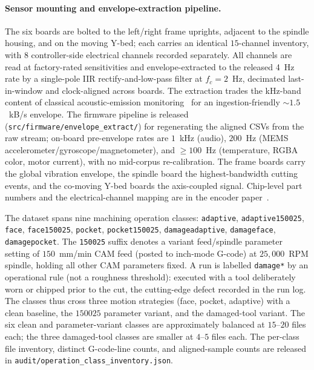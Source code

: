 \documentclass[sensors,article,submit,moreauthors,pdftex]{Definitions/mdpi}
\begin{document}
\paragraph{Sensor mounting and envelope-extraction pipeline.} The six boards are bolted to the left/right frame uprights, adjacent to the spindle housing, and on the moving Y-bed; each carries an identical $15$-channel inventory, with 8 controller-side electrical channels recorded separately. All channels are read at factory-rated sensitivities and envelope-extracted to the released 4~Hz rate by a single-pole IIR rectify-and-low-pass filter at $f_c\!=\!2$~Hz, decimated last-in-window and clock-aligned across boards. The extraction trades the kHz-band content of classical acoustic-emission monitoring~\cite{teti2010advanced} for an ingestion-friendly $\sim 1.5$~kB/s envelope. The firmware pipeline is released (\texttt{src/firmware/envelope\_extract/}) for regenerating the aligned CSVs from the raw stream; on-board pre-envelope rates are $1$~kHz (audio), $200$~Hz (MEMS accelerometer/gyroscope/magnetometer), and $\geq\!100$~Hz (temperature, RGBA color, motor current), with no mid-corpus re-calibration. The frame boards carry the global vibration envelope, the spindle board the highest-bandwidth cutting events, and the co-moving Y-bed boards the axis-coupled signal. Chip-level part numbers and the electrical-channel mapping are in the encoder paper~\cite{encoder_paper}.

The dataset spans nine machining operation classes: \texttt{adaptive}, \texttt{adaptive150025}, \texttt{face}, \texttt{face150025}, \texttt{pocket}, \texttt{pocket150025}, \texttt{damageadaptive}, \texttt{damageface}, \texttt{damagepocket}. The \texttt{150025} suffix denotes a variant feed/spindle parameter setting of $150$~mm/min CAM feed (posted to inch-mode G-code) at $25{,}000$~RPM spindle, holding all other CAM parameters fixed. A run is labelled \texttt{damage*} by an operational rule (not a roughness threshold): executed with a tool deliberately worn or chipped prior to the cut, the cutting-edge defect recorded in the run log. The classes thus cross three motion strategies (face, pocket, adaptive) with a clean baseline, the $150025$ parameter variant, and the damaged-tool variant. The six clean and parameter-variant classes are approximately balanced at $15$--$20$ files each; the three damaged-tool classes are smaller at $4$--$5$ files each. The per-class file inventory, distinct G-code-line counts, and aligned-sample counts are released in \texttt{audit/operation\_class\_inventory.json}.
\end{document}
